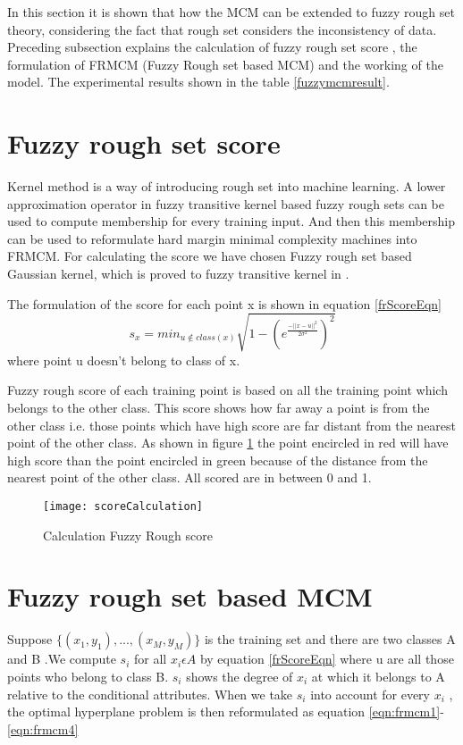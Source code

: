 In this section it is shown that how the MCM can be extended to fuzzy rough set theory, considering the fact that rough set considers the inconsistency of data. Preceding subsection explains the calculation of fuzzy rough set score , the formulation of FRMCM (Fuzzy Rough set based MCM) and the working of the model. The experimental results shown in the table \ref{fuzzymcmresult}.

\section{Fuzzy rough set score}
Kernel method is a way of introducing rough set into machine learning. A lower approximation operator in fuzzy transitive kernel based fuzzy rough sets can be used to compute membership for every training input. And then this membership can be used to reformulate hard margin minimal complexity machines into FRMCM. For calculating the score we have chosen Fuzzy rough set based Gaussian kernel, which is proved to fuzzy transitive kernel in \cite{FuzzyScore}.

The formulation of the score for each point x is shown in equation \ref{frScoreEqn} 
\begin{equation}\label{frScoreEqn}
s_x = min_{u \notin class(x)}\sqrt{1-(e^\frac{-||x-u||^2}{2\sigma^2})^2}
\end{equation}
where point u doesn't belong to class of x.


Fuzzy rough score of each training point is based on all the training point which belongs to the other class. This score shows how far away a point is from the other class i.e. those points which have high score are far distant from the nearest point of the other class. As shown in figure \ref{fig:frScore} the point encircled in red will have high score than the point encircled in green because of the distance from the nearest point of the other class. All scored are in between 0 and 1.

\begin{figure}
\begin{center}	
\texttt{[image: scoreCalculation]} 
\caption{Calculation Fuzzy Rough score}
\label{fig:frScore}
\end{center}
\end{figure}

\section{Fuzzy rough set based MCM}
Suppose $\{(x_1 , y_1 ),..., (x_M , y_M )\}$ is the training set and there are two classes A and B .We compute $s_i$ for all $x_i\epsilon A$ by equation \ref{frScoreEqn} where u are all those points who belong to class B. $s_i$ shows the degree of $x_i$ at which it belongs to A relative to the
conditional attributes. When we take $s_i$ into account for every $x_i$ , the optimal hyperplane problem is then reformulated as equation \ref{eqn:frmcm1}-\ref{eqn:frmcm4}

